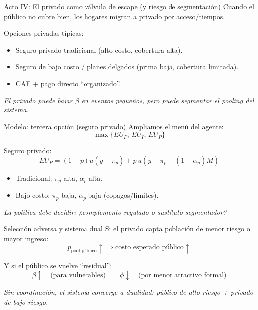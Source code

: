 \documentclass[10pt]{beamer}
\begin{document}
\begin{frame}{Acto IV: El privado como válvula de escape (y riesgo de segmentación)}
Cuando el público no cubre bien, los hogares migran a privado por acceso/tiempos.

Opciones privadas típicas:
\begin{itemize}
  \item Seguro privado tradicional (alto costo, cobertura alta).
  \item Seguro de bajo costo / planes delgados (prima baja, cobertura limitada).
  \item CAF + pago directo “organizado”.
\end{itemize}

\bigskip
\emph{El privado puede bajar \(\beta\) en eventos pequeños, pero puede segmentar el pooling del sistema.}
\end{frame}

\begin{frame}{Modelo: tercera opción (seguro privado)}
Ampliamos el menú del agente:
\[
\max\{EU_F,\,EU_I,\,EU_P\}
\]

Seguro privado:
\[
EU_P=(1-p)u(y-\pi_p)+p\,u(y-\pi_p-(1-\alpha_p)M)
\]

\bigskip
\begin{itemize}
  \item Tradicional: \(\pi_p\) alta, \(\alpha_p\) alta.
  \item Bajo costo: \(\pi_p\) baja, \(\alpha_p\) baja (copagos/límites).
\end{itemize}

\bigskip
\emph{La política debe decidir: ¿complemento regulado o sustituto segmentador?}
\end{frame}

\begin{frame}{Selección adversa y sistema dual}
Si el privado capta población de menor riesgo o mayor ingreso:
\[
p_{\text{pool público}} \uparrow
\Rightarrow
\text{costo esperado público} \uparrow
\]

Y si el público se vuelve “residual”:
\[
\beta \uparrow \quad \text{(para vulnerables)} \qquad
\phi \downarrow \quad \text{(por menor atractivo formal)}
\]

\bigskip
\emph{Sin coordinación, el sistema converge a dualidad: público de alto riesgo + privado de bajo riesgo.}
\end{frame}

\end{document}
